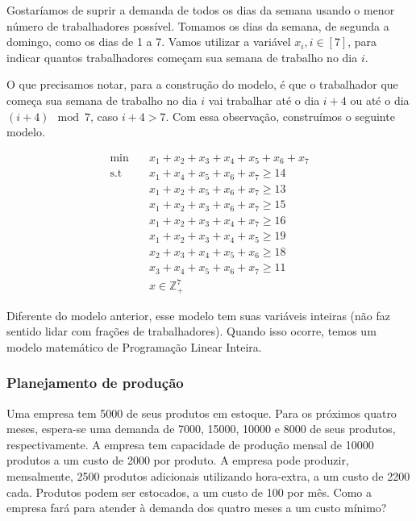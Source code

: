 \documentclass[]{article}
\numberwithin{equation}{section}
\begin{document}
Gostaríamos de suprir a demanda de todos os dias da semana usando o menor número de trabalhadores possível.
Tomamos os dias da semana, de segunda a domingo, como os dias de 1 a 7.
Vamos utilizar a variável $x_i, i \in [7]$, para indicar quantos trabalhadores começam sua semana de trabalho no dia $i$.

O que precisamos notar, para a construção do modelo, é que o trabalhador que começa sua semana de trabalho no dia $i$
vai trabalhar até o dia $i + 4$ ou até o dia $(i + 4) \mod 7$, caso $i + 4 > 7$.
Com essa observação, construímos o seguinte modelo.

\begin{align}
\min        &\quad  x_1 + x_2 + x_3 + x_4 + x_5 + x_6 + x_7 \\
\text{s.t}  &\quad  x_1 + x_4 + x_5 + x_6 + x_7 \geq 14 \\
            &\quad  x_1 + x_2 + x_5 + x_6 + x_7 \geq 13 \\
            &\quad  x_1 + x_2 + x_3 + x_6 + x_7 \geq 15 \\
            &\quad  x_1 + x_2 + x_3 + x_4 + x_7 \geq 16 \\
            &\quad  x_1 + x_2 + x_3 + x_4 + x_5 \geq 19 \\
            &\quad  x_2 + x_3 + x_4 + x_5 + x_6 \geq 18 \\
            &\quad  x_3 + x_4 + x_5 + x_6 + x_7 \geq 11 \\
            &\quad  x \in \mathbb{Z}_+^7
\end{align}

Diferente do modelo anterior, esse modelo tem suas variáveis inteiras (não faz sentido lidar com frações de trabalhadores). Quando isso ocorre, temos um modelo matemático de Programação Linear Inteira.

\subsubsection{Planejamento de produção}

Uma empresa tem 5000 de seus produtos em estoque.
Para os próximos quatro meses, espera-se uma demanda de 7000, 15000, 10000 e 8000 de seus produtos, respectivamente.
A empresa tem capacidade de produção mensal de 10000 produtos a um custo de 2000 por produto.
A empresa pode produzir, mensalmente, 2500 produtos adicionais utilizando hora-extra, a um custo de 2200 cada.
Produtos podem ser estocados, a um custo de 100 por mês.
Como a empresa fará para atender à demanda dos quatro meses a um custo mínimo?
\end{document}
